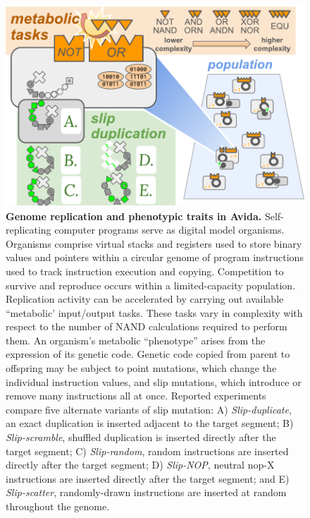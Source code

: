 \begin{figure}[!ht]
\centering
\includegraphics[width=\linewidth]{imgs/GeneDupeOps.pdf}
\caption{%
\textbf{Genome replication and phenotypic traits in Avida.}
\footnotesize
Self-replicating computer programs serve as digital model organisms.
Organisms comprise virtual stacks and registers used to store binary values and pointers within a circular genome of program instructions used to track instruction execution and copying.
Competition to survive and reproduce occurs within a limited-capacity population.
Replication activity can be accelerated by carrying out available ``metabolic' input/output tasks.
These tasks vary in complexity with respect to the number of NAND calculations required to perform them.
An organism's metabolic ``phenotype'' arises from the expression of its genetic code.
Genetic code copied from parent to offspring may be subject to point mutations, which change the individual instruction values, and slip mutations, which introduce or remove many instructions all at once.
Reported experiments compare five alternate variants of slip mutation:
A) \textit{Slip-duplicate}, an exact duplication is inserted adjacent to the target segment;
B) \textit{Slip-scramble}, shuffled duplication is inserted directly after the target segment;
C) \textit{Slip-random}, random instructions are inserted directly after the target segment;
D) \textit{Slip-NOP}, neutral nop-X instructions are inserted directly after the target segment; and
E) \textit{Slip-scatter}, randomly-drawn instructions are inserted at random throughout the genome.
}
\label{fig:slip_mut_variants}
\end{figure}
